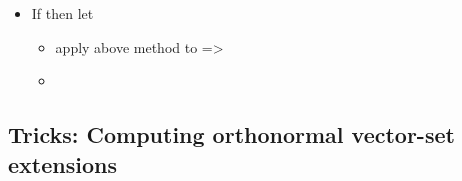 \begin{itemize}
\begin{itemize}
\begin{itemize}
\begin{itemize}
                                \begin{itemize}

                                  \item
                                        Solve for unit-vector  s.t. it is
                                        orthogonal to 
                                  \item
                                        Then solve for unit-vector  s.t. it is
                                        orthogonal to 
                                  \item
                                        And so on\ldots{} {[}{[}\#Tricks Computing orthonormal
                                        vector-set extensions\textbar see this for better
                                        methods{]}{]}
                                \end{itemize}
                          \item
                                is {[}{[}tutorial 1\#Orthogonality
                                concepts\textbar orthogonal{]}{]} so 
                        \end{itemize}
                  \item
                        ,
                        \textbf{AND DONE!!!}
                \end{itemize}
          \item
                If  then let 

                \begin{itemize}

                  \item
                        apply above method to  =\textgreater{}
                  \item
                \end{itemize}
        \end{itemize}
\end{itemize}

\subsection*{Tricks: Computing orthonormal vector-set
  extensions}

